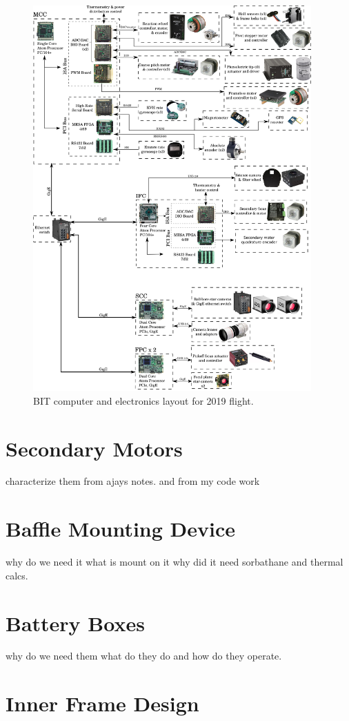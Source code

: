 \begin{figure}
    \begin{small}
        \begin{center}
            \includegraphics[width=0.95\textwidth]{Hardware/figs/electronics.png}
        \end{center}
        \caption{BIT computer and electronics layout for 2019 flight.}
        \label{fig:electronics}
    \end{small}
\end{figure}


\section{Secondary Motors}
characterize them from ajays notes. and from my code work

\section{Baffle Mounting Device}
why do we need it what is mount on it why did it need sorbathane and thermal calcs.

\section{Battery Boxes}
why do we need them what do they do and how do they operate.

\section{Inner Frame Design}


